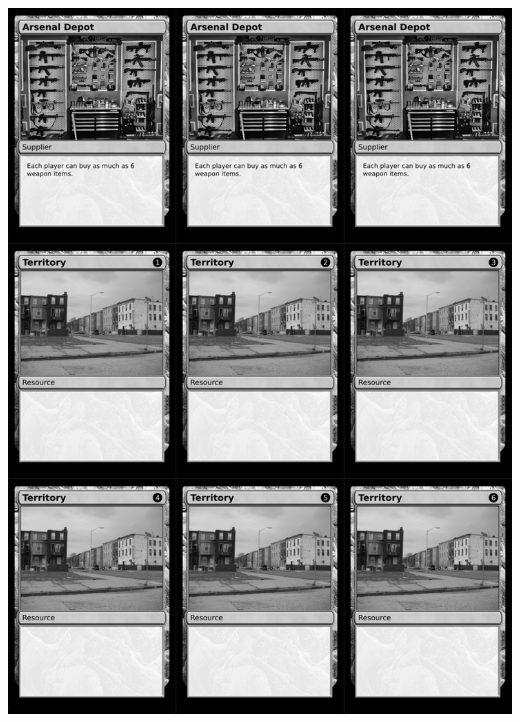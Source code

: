 \documentclass[a4paper]{article}
\begin{document}
\newpage

\begin{center}
	\centering
	\includegraphics[width=200.5mm,height=280.7mm]{output/temp/page23.png}
\end{center}
\end{document}
